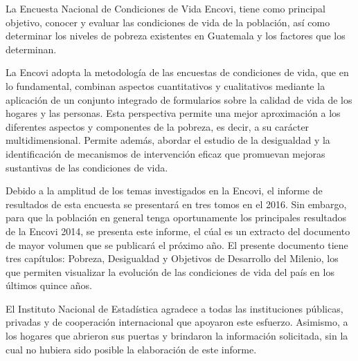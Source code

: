 La Encuesta Nacional de Condiciones de Vida \textemdash Encovi\textemdash, tiene como principal objetivo, conocer y evaluar las condiciones de vida de la población, así como determinar los niveles de pobreza existentes en Guatemala y los factores que los determinan.
 
 La Encovi adopta la metodología de las encuestas de condiciones de vida, que en lo fundamental, combinan aspectos cuantitativos y cualitativos mediante la aplicación de un conjunto integrado de formularios sobre la calidad de vida de los hogares y las personas. Esta perspectiva permite una mejor aproximación a los diferentes aspectos y componentes de la pobreza, es decir, a su carácter multidimensional. Permite además, abordar el estudio de la desigualdad y la identificación de mecanismos de intervención eficaz que promuevan mejoras sustantivas de las condiciones de vida.

Debido a la amplitud de los temas investigados en la Encovi, el informe de resultados de esta encuesta se presentará en tres tomos en el 2016. Sin embargo, para que la población en general tenga oportunamente    los principales resultados de la Encovi 2014, se presenta este informe, el cúal es un extracto del documento de mayor volumen que se publicará el próximo año.  El presente documento tiene tres capítulos: Pobreza, Desigualdad y Objetivos de Desarrollo del Milenio, los que permiten visualizar la evolución de las condiciones de vida del país en los últimos quince años. 


El Instituto Nacional de Estadística agradece a todas las instituciones públicas, privadas y de cooperación internacional que apoyaron este esfuerzo. Asimismo, a los hogares que abrieron sus puertas y  brindaron  la información  solicitada, sin la cual no hubiera sido posible  la elaboración de este informe.\\[1cm] 